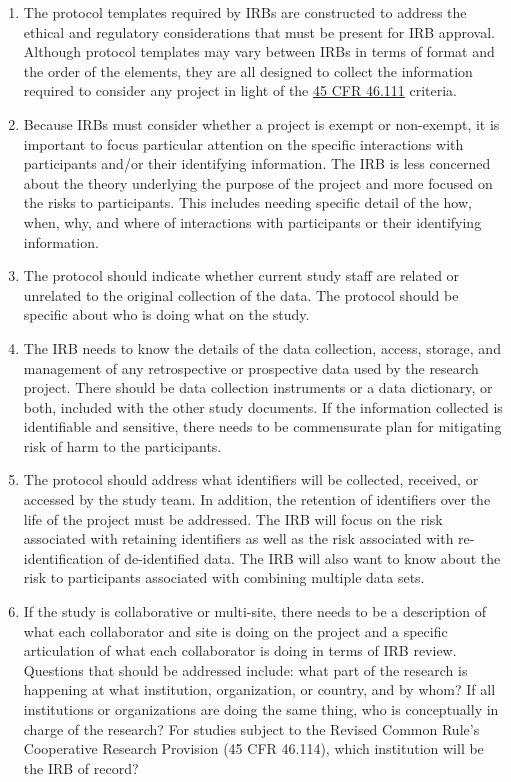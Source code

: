 \begin{enumerate}
\def\labelenumi{\arabic{enumi}.}
\item
  The protocol templates required by IRBs are constructed to address the ethical and regulatory considerations that must be present for IRB approval. Although protocol templates may vary between IRBs in terms of format and the order of the elements, they are all designed to collect the information required to consider any project in light of the \href{https://www.law.cornell.edu/cfr/text/45/46.111}{45 CFR 46.111} criteria.
\item
  Because IRBs must consider whether a project is exempt or non-exempt, it is important to focus particular attention on the specific interactions with participants and/or their identifying information. The IRB is less concerned about the theory underlying the purpose of the project and more focused on the risks to participants. This includes needing specific detail of the how, when, why, and where of interactions with participants or their identifying information.
\item
  The protocol should indicate whether current study staff are related or unrelated to the original collection of the data. The protocol should be specific about who is doing what on the study.
\item
  The IRB needs to know the details of the data collection, access, storage, and management of any retrospective or prospective data used by the research project. There should be data collection instruments or a data dictionary, or both, included with the other study documents. If the information collected is identifiable and sensitive, there needs to be commensurate plan for mitigating risk of harm to the participants.
\item
  The protocol should address what identifiers will be collected, received, or accessed by the study team. In addition, the retention of identifiers over the life of the project must be addressed. The IRB will focus on the risk associated with retaining identifiers as well as the risk associated with re-identification of de-identified data. The IRB will also want to know about the risk to participants associated with combining multiple data sets.
\item
  If the study is collaborative or multi-site, there needs to be a description of what each collaborator and site is doing on the project and a specific articulation of what each collaborator is doing in terms of IRB review. Questions that should be addressed include: what part of the research is happening at what institution, organization, or country, and by whom? If all institutions or organizations are doing the same thing, who is conceptually in charge of the research? For studies subject to the Revised Common Rule's Cooperative Research Provision (45 CFR 46.114), which institution will be the IRB of record?

\end{enumerate}
